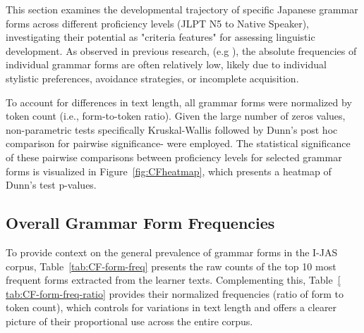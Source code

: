 



This section examines the developmental trajectory of specific Japanese grammar forms across different proficiency
levels (JLPT N5 to Native Speaker), investigating their potential  as "criteria features" for assessing linguistic
development. As observed in previous research, (e.g \citet{akef2025}), the absolute
frequencies of individual grammar
forms are often relatively low, likely due to individual stylistic preferences, avoidance strategies, or incomplete
acquisition.

To account for differences in text length, all grammar forms were normalized by token count (i.e., form-to-token
ratio). Given the large number of zeros values, non-parametric tests specifically Kruskal-Wallis followed by Dunn's
post hoc comparison for pairwise significance- were employed. The statistical significance of these pairwise
comparisons between proficiency levels for selected grammar forms is visualized in Figure~\ref{fig:CFheatmap}, which
presents a heatmap of Dunn's test p-values.


\subsection{Overall Grammar Form Frequencies}
To provide context on the general prevalence of grammar forms in the I-JAS corpus, Table~\ref{tab:CF-form-freq}
presents the raw counts of the top 10 most frequent forms extracted from the learner texts. Complementing this,
Table~\ref{
tab:CF-form-freq-ratio} provides their normalized frequencies (ratio of form to token count), which controls for
variations in text length and offers a clearer picture of their proportional use across the entire corpus.


